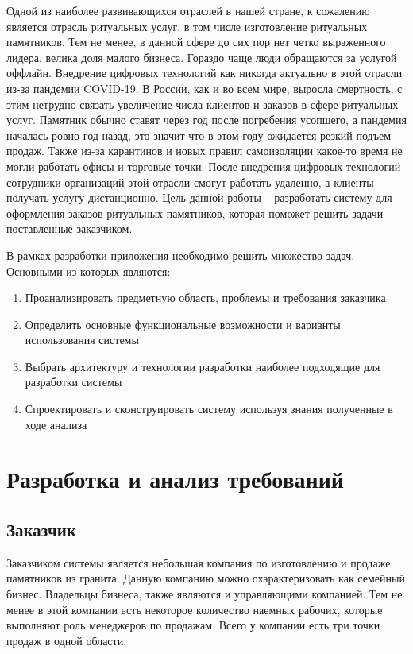 \documentclass[a4paper,article,14pt]{extarticle}
\begin{document}


\tableofcontents
\pagebreak


Одной из наиболее развивающихся отраслей в нашей стране, к сожалению является отрасль ритуальных услуг,
в том числе изготовление ритуальных памятников. 
Тем не менее, в данной сфере до сих пор нет четко выраженного лидера, велика доля малого бизнеса.
Гораздо чаще люди обращаются за услугой оффлайн.
Внедрение цифровых технологий как никогда актуально в этой отрасли из-за пандемии COVID-19.
В России, как и во всем мире, выросла смертность, с этим нетрудно связать увеличение числа клиентов и заказов в сфере ритуальных услуг.
Памятник обычно ставят через год после погребения усопшего, а пандемия началась ровно год назад,
это значит что в этом году ожидается резкий подъем продаж. 
Также из-за карантинов и новых правил самоизоляции какое-то время не могли работать офисы и торговые точки. 
После внедрения цифровых технологий сотрудники организаций этой отрасли смогут работать удаленно, а клиенты получать услугу дистанционно.
Цель данной работы – разработать систему для оформления заказов ритуальных памятников,
которая поможет решить задачи поставленные заказчиком.



В рамках разработки приложения необходимо решить множество задач. Основными из которых являются:

\begin{enumerate}
    \item Проанализировать предметную область, проблемы и требования заказчика
    \item Определить основные функциональные возможности и варианты использования системы
    \item Выбрать архитектуру и технологии разработки наиболее подходящие для разработки системы
    \item Спроектировать и сконструировать систему используя знания полученные в ходе анализа
\end{enumerate}


\section{Разработка и анализ требований}
\subsection{Заказчик}
Заказчиком системы является небольшая компания по изготовлению и продаже памятников из гранита. 
Данную компанию можно охарактеризовать как семейный бизнес.
Владельцы бизнеса, также являются и управляющими компанией. 
Тем не менее в этой компании есть некоторое количество наемных рабочих, которые выполняют роль менеджеров по продажам.
Всего у компании есть три точки продаж в одной области.
\end{document}
